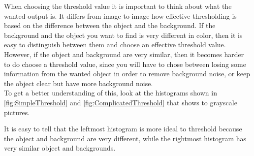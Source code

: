 When choosing the threshold value it is important to think about what the wanted output is. It differs  from image to image how effective thresholding is based on the difference between the object and the background. If the background and the object you want to find is very different in color, then it is easy to distinguish between them and choose an effective threshold value. However, if the object and background are very similar, then it becomes harder to do choose a threshold value, since you will have to chose between losing some information from the wanted object in order to remove background noise, or keep the object clear but have more background noise. \\
To get a better understanding of this, look at the histograms shown in \eqref{fig:SimpleThreshold} and \eqref{fig:ComplicatedThreshold} that shows to grayscale pictures.

It is easy to tell that the leftmost histogram is more ideal to threshold because the object and background are very different, while the rightmost histogram has very similar object and backgrounds.

